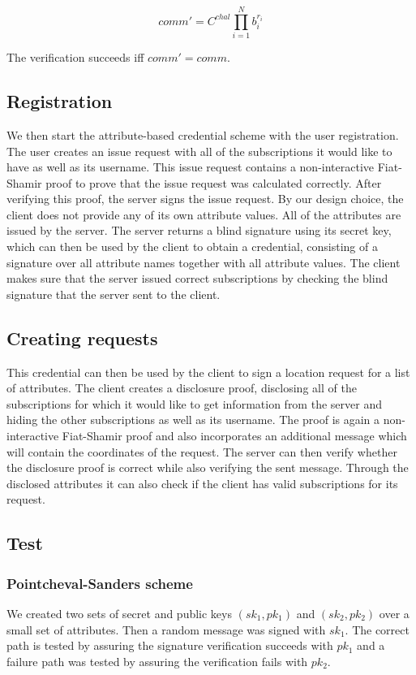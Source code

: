 \documentclass[9pt,conference]{IEEEtran}
\begin{document}
$${comm' = C ^ {chal} \prod_{i=1}^N b_i ^ {r_i}}$$

The verification succeeds iff $comm' = comm$.

\subsection{Registration}
We then start the attribute-based credential scheme with the user registration. The user creates an issue request with all of the subscriptions it would like to have as well as its username. This issue request contains a non-interactive Fiat-Shamir proof to prove that the issue request was calculated correctly. After verifying this proof, the server signs the issue request. By our design choice, the client does not provide any of its own attribute values. All of the attributes are issued by the server. The server returns a blind signature using its secret key, which can then be used by the client to obtain a credential, consisting of a signature over all attribute names together with all attribute values. The client makes sure that the server issued correct subscriptions by checking the blind signature that the server sent to the client.

\subsection{Creating requests}
This credential can then be used by the client to sign a location request for a list of attributes. The client creates a disclosure proof, disclosing all of the subscriptions for which it would like to get information from the server and hiding the other subscriptions as well as its username. The proof is again a non-interactive Fiat-Shamir proof and also incorporates an additional message which will contain the coordinates of the request. The server can then verify whether the disclosure proof is correct while also verifying the sent message. Through the disclosed attributes it can also check if the client has valid subscriptions for its request. 

\subsection{Test}
\subsubsection{Pointcheval-Sanders scheme}
We created two sets of secret and public keys $(sk_1, pk_1)$ and $(sk_2, pk_2)$ over a small set of attributes. Then a random message was signed with $sk_1$. The correct path is tested by assuring the signature verification succeeds with $pk_1$ and a failure path was tested by assuring the verification fails with $pk_2$.
\end{document}
